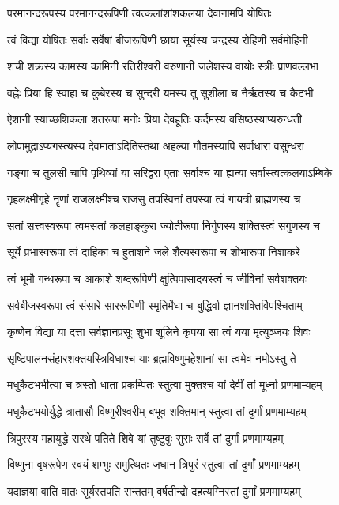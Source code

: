\twolineshloka
{परमानन्दरूपस्य परमानन्दरूपिणी}
{त्वत्कलांशांशकलया देवानामपि योषितः}

\twolineshloka
{त्वं विद्या योषितः सर्वाः सर्वेषां बीजरूपिणी}
{छाया सूर्यस्य चन्द्रस्य रोहिणी सर्वमोहिनी}

\twolineshloka
{शची शक्रस्य कामस्य कामिनी रतिरीश्वरी}
{वरुणानी जलेशस्य वायोः स्त्रीः प्राणवल्लभा}

\twolineshloka
{वह्नेः प्रिया हि स्वाहा च कुबेरस्य च सुन्दरी}
{यमस्य तु सुशीला च नैर्ऋतस्य च कैटभी}

\twolineshloka
{ऐशानी स्याच्छशिकला शतरूपा मनोः प्रिया}
{देवहूतिः कर्दमस्य वसिष्ठस्याप्यरुन्धती}

\twolineshloka
{लोपामुद्राऽप्यगस्त्यस्य देवमाताऽदितिस्तथा}
{अहल्या गौतमस्यापि सर्वाधारा वसुन्धरा}

\twolineshloka
{गङ्गा च तुलसी चापि पृथिव्यां या सरिद्वरा}
{एताः सर्वाश्च या ह्यन्या सर्वास्त्वत्कलयाऽम्बिके}

\twolineshloka
{गृहलक्ष्मीगृहे नॄणां राजलक्ष्मीश्च राजसु}
{तपस्विनां तपस्या त्वं गायत्री ब्राह्मणस्य च}

\twolineshloka
{सतां सत्त्‍‌वस्वरूपा त्वमसतां कलहाङ्कुरा}
{ज्योतीरूपा निर्गुणस्य शक्तिस्त्वं सगुणस्य च}

\twolineshloka
{सूर्ये प्रभास्वरूपा त्वं दाहिका च हुताशने}
{जले शैत्यस्वरूपा च शोभारूपा निशाकरे}

\twolineshloka
{त्वं भूमौ गन्धरूपा च आकाशे शब्दरूपिणी}
{क्षुत्पिपासादयस्त्वं च जीविनां सर्वशक्तयः}

\twolineshloka
{सर्वबीजस्वरूपा त्वं संसारे साररूपिणी}
{स्मृतिर्मेधा च बुद्धिर्वा ज्ञानशक्तिर्विपश्चिताम्}

\twolineshloka
{कृष्णेन विद्या या दत्ता सर्वज्ञानप्रसूः शुभा}
{शूलिने कृपया सा त्वं यया मृत्युञ्जयः शिवः}

\twolineshloka
{सृष्टिपालनसंहारशक्तयस्त्रिविधाश्च याः}
{ब्रह्मविष्णुमहेशानां सा त्वमेव नमोऽस्तु ते}

\twolineshloka
{मधुकैटभभीत्या च त्रस्तो धाता प्रकम्पितः}
{स्तुत्वा मुक्तश्च यां देवीं तां मूर्ध्ना प्रणमाम्यहम्}

\twolineshloka
{मधुकैटभयोर्युद्धे त्रातासौ विष्णुरीश्वरीम्}
{बभूव शक्तिमान् स्तुत्वा तां दुर्गां प्रणमाम्यहम्}

\twolineshloka
{त्रिपुरस्य महायुद्धे सरथे पतिते शिवे}
{यां तुष्टुवुः सुराः सर्वे तां दुर्गां प्रणमाम्यहम्}

\twolineshloka
{विष्णुना वृषरूपेण स्वयं शम्भुः समुत्थितः}
{जघान त्रिपुरं स्तुत्वा तां दुर्गां प्रणमाम्यहम्}

\twolineshloka
{यदाज्ञया वाति वातः सूर्यस्तपति सन्ततम्}
{वर्षतीन्द्रो दहत्यग्निस्तां दुर्गां प्रणमाम्यहम्}

